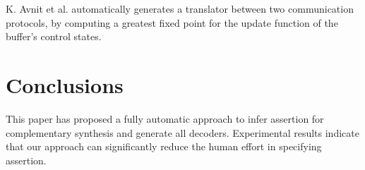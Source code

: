 \documentclass[journal]{IEEEtran}
\begin{document}
K. Avnit et al. \cite{converter_date08} automatically generates a translator between two communication protocols,
by computing a greatest fixed point for the update function of the buffer's control states.



\section{Conclusions}\label{sec_conclude}

This paper has proposed a fully automatic approach to infer assertion for complementary synthesis and generate all decoders.
Experimental results indicate that our approach can significantly reduce the human effort in specifying assertion.


%
%
\end{document}
